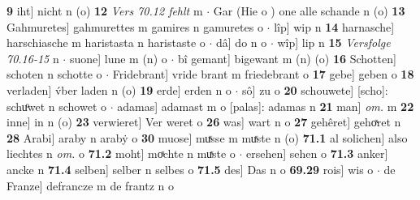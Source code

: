 \documentclass[8pt,a4paper,notitlepage]{article}
\begin{document}
\begin{table}[ht]
\begin{minipage}[t]{0.5\linewidth}
\textbf{9} iht] nicht n (o) \textbf{12} \textit{Vers 70.12 fehlt} m   $\cdot$ Gar (Hie o ) one alle schande n (o) \textbf{13} Gahmuretes] gahmurettes m gamires n gamuretes o  $\cdot$ lîp] wip n \textbf{14} harnasche] harschiasche m haristasta n haristaste o  $\cdot$ dâ] do n o  $\cdot$ wîp] lip n \textbf{15} \textit{Versfolge 70.16-15} n   $\cdot$ suone] lune m (n) o  $\cdot$ bî gemant] bigewant m (n) (o) \textbf{16} Schotten] schoten n schotte o  $\cdot$ Fridebrant] vride brant m friedebrant o \textbf{17} gebe] geben o \textbf{18} verladen] v́ber laden n (o) \textbf{19} erde] erden n o  $\cdot$ sô] zu o \textbf{20} schouwete] [scho]: schuͦwet n schowet o  $\cdot$ adamas] adamast m o [palas]: adamas n \textbf{21} man] \textit{om.} m \textbf{22} inne] in n (o) \textbf{23} verwieret] Ver weret o \textbf{26} was] wart n o \textbf{27} gehêret] gehoͯret n \textbf{28} Arabi] araby n arabẏ o \textbf{30} muose] muͯsse m muͯste n (o) \textbf{71.1} al solichen] also liechtes n \textit{om.} o \textbf{71.2} moht] moͯchte n muͯste o  $\cdot$ ersehen] sehen o \textbf{71.3} anker] ancke n \textbf{71.4} selben] selber n selbes o \textbf{71.5} des] Das n o \textbf{69.29} rois] wis o  $\cdot$ de Franze] defrancze m de frantz n o \newline
\end{minipage}
\end{table}
\newpage
\end{document}
